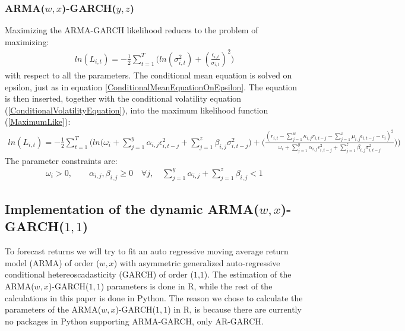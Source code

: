 \subsubsection{ARMA($w,x$)-GARCH($y,z$)}
Maximizing the ARMA-GARCH likelihood reduces to the problem of maximizing:
\begin{align} 
    ln(L_{i,t})=-\frac{1}{2}\sum_{t=1}^T\bigg( ln(\sigma_{i,t}^2)+(\frac{\epsilon_{i,t}}{\sigma_{i,t}})^2\bigg)   \label{MaximumLike}
\end{align}
with respect to all the parameters. The conditional mean equation is solved on epsilon, just as in equation \ref{ConditionalMeanEquationOnEpsilon}. The equation is then inserted, together with the conditional volatility equation (\ref{ConditionalVolatilityEquation}), into the maximum likelihood function (\ref{MaximumLike}):
\begin{align} 
    ln(L_{i,t})=-\frac{1}{2}\sum_{t=1}^T \Bigg(ln\Big(\omega_i + \sum_{j=1}^y\alpha_{i,j}\epsilon_{i,t-j}^2+\sum_{j=1}^z\beta_{i,j}\sigma_{i,t-j}^2\big)+\Big(\frac{(r_{i,t}-\sum_{j=1}^w\kappa_{i,j} r_{i,t-j}-\sum_{j=1}^x\mu_{i,j} \epsilon_{i,t-j}-c_i)^2}{\omega_i + \sum_{j=1}^y \alpha_{i,j} \epsilon_{i,t-j}^2 +\sum_{j=1}^z\beta_{i,j}\sigma_{i,t-j}^2}\Big)\Bigg)   \label{fullMaximumLike}
\end{align}
The parameter constraints are:
\begin{align} 
    \omega_i>0,\quad\quad \alpha_{i,j},\beta_{i,j}\geq0 \quad \forall j, \quad \sum_{j=1}^y\alpha_{i,j}+\sum_{j=1}^z\beta_{i,j}<1 \label{ParameterConstraints}
\end{align}

\subsection{Implementation of the dynamic ARMA($w,x$)-GARCH($1,1$)}
To forecast returns we will try to fit an auto regressive moving average return model (ARMA) of order ($w,x$) with asymmetric generalized auto-regressive conditional hetereoscadasticity (GARCH) of order ($1$,$1$). The estimation of the ARMA($w,x$)-GARCH($1,1$) parameters is done in R, while the rest of the calculations in this paper is done in Python. The reason we chose to calculate the parameters of the ARMA($w,x$)-GARCH($1,1$) in R, is because there are currently no packages in Python supporting ARMA-GARCH, only AR-GARCH. 

